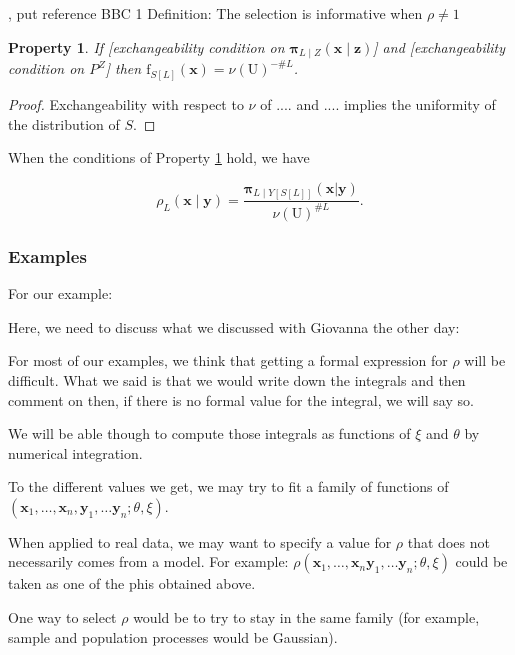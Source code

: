 \documentclass[12pt]{article}
\newtheorem{property}{Property}[section]
\theoremstyle{definition}
\theoremstyle{remark}
\newcommand{\dominantU}{\nu}
\newcommand{\sampledensity}{\mathbf{\pi}}
\newcommand{\density}{\mathrm{f}}
\newcommand{\Sample}{S}
\newcommand{\Pop}{\mathrm{U}}
\newcommand{\position}{\mathbf{x}}
\newcommand{\Sampleindex}{L}
\newcommand{\Signal}{Y}
\newcommand{\signal}{\mathbf{y}}
\newcommand{\Desvar}{Z}
\newcommand{\desvar}{\mathbf{z}}
\begin{document}
\cite{pfefferman_1992}, {\color{red} put reference BBC 1
}
Definition: The selection is informative when $\rho\neq1$


\begin{property}\label{Prop:1}
If 
[exchangeability condition on $\sampledensity_{\Sampleindex\mid \Desvar}(\position\mid \desvar)$] and 
[exchangeability condition on $P^Z$] 
then $\density_{\Sample[\Sampleindex]}(\position)=\dominantU(\Pop)^{-\#\Sampleindex}$.
\end{property}
\begin{proof}
Exchangeability with respect to $\dominantU$ of $....$ and $....$  implies the uniformity of the distribution of $\Sample$.
\end{proof}
When the conditions of Property \ref{Prop:1} hold, we have


\begin{equation}
\rho_{\Sampleindex}\left(\position \mid \signal\right)=
    \frac{\sampledensity_{\Sampleindex\mid \Signal[\Sample[\Sampleindex]]}\left(\position|\signal\right)}
    {\dominantU(\Pop)^{\#\Sampleindex}}.
\end{equation}

\subsubsection{Examples}



For our example:

Here, we need to discuss what we discussed with Giovanna the other day:

For most of our examples, we think that getting a formal expression for $\rho$ will be difficult.
What we said is that we would write down the integrals and then comment on then, if there is no formal value for the integral, we will say so.

We will be able though to compute those integrals as functions of $\xi$ and $\theta$ by numerical integration.

To the different values we get, we may try to fit a family of functions of $(\position_1,\ldots,\position_n, \signal_1,\ldots \signal_n;\theta,\xi)$.

When applied to real data, we may want to specify a value for $\rho$ that does not necessarily comes from a model. For example:
$\rho(\position_1,\ldots,\position_n\signal_1,\ldots\signal_n;\theta,\xi)$ could be taken as one of the phis obtained above.

One way to select $\rho$ would be to try to stay in the same family (for example, sample and population processes would be Gaussian). 
\end{document}
